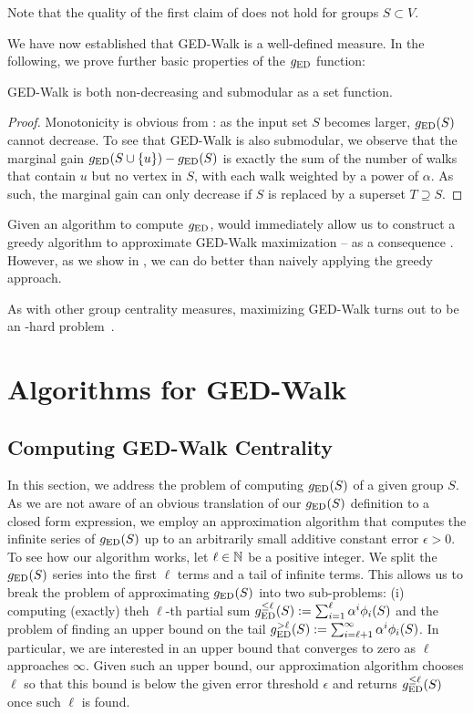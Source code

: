 Note that the quality of the first claim of 
does not  hold for groups $S \subset V$.

We have now established that GED-Walk is a well-defined measure. In
the following, we prove further basic properties of the $g_{\text{ED}}$ function:

\begin{proposition}
\label{prop:ged-walk:mon-submod}
GED-Walk is both non-decreasing and submodular as a set function.
\end{proposition}

\begin{proof}
Monotonicity is obvious from : as the input
set $S$ becomes larger, $g_{\text{ED}}(S)$ cannot decrease. To see that
GED-Walk is also submodular, we observe that the marginal gain
$\ged(S \cup \set{u}) - \ged(S)$ is exactly the sum of the
number of walks that contain $u$ but no vertex in $S$, with
each walk weighted by a power of $\alpha$.
As such, the marginal gain can only decrease if $S$ is replaced
by a superset $T \supseteq S$.
\end{proof}

Given an algorithm to compute $g_{\text{ED}}$, 
would immediately allow us to construct a greedy algorithm to
approximate GED-Walk maximization -- as a consequence
.
%
However, as we show in , we can
do better than naively applying the greedy approach.

As with other group centrality measures, maximizing GED-Walk turns
out to be an \np-hard problem~\cite[Theorem 2.1]{DBLP:conf/alenex/AngrimanGBZGM20}.

\section{Algorithms for GED-Walk}
\subsection{Computing GED-Walk Centrality}
\label{sec:ged-walk:compute-ged}
%
In this section, we address the problem of computing $g_{\text{ED}}(S)$ of a given group
$S$. As we are not aware of an obvious translation of our $g_{\text{ED}}(S)$ definition
to a closed form expression, we employ an approximation algorithm that computes
the infinite series of $g_{\text{ED}}(S)$ up to an arbitrarily small additive constant
error $\epsilon > 0$.
%
To see how our algorithm works, let $\ell\in\mathbb{N}$ be a positive integer.
We split the $g_{\text{ED}}(S)$ series into the first $\ell$ terms and a tail of
infinite terms. This allows us to break the problem of approximating
$g_{\text{ED}}(S)$ into two sub-problems: (i) computing (exactly) theh $\ell$-th
partial sum $g_{\text{ED}}^{\le\ell}(S) := \sum_{i = 1}^{\ell}\alpha^i\phi_i(S)$ and the
problem of finding an upper bound on the tail
$g_{\text{ED}}^{>\ell}(S) := \sum_{i = \ell + 1}^{\infty} \alpha^i\phi_i(S)$.
In particular, we are interested in an upper bound that converges
to zero as $\ell$ approaches $\infty$. Given such an upper bound,
our approximation algorithm chooses $\ell$ so that this bound
is below the given error threshold $\epsilon$ and returns
$g_{\text{ED}}^{\le\ell}(S)$ once such $\ell$ is found.

